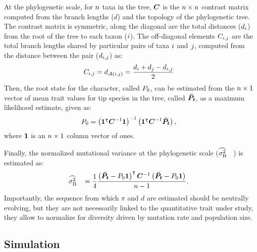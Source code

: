 \documentclass{article}
\begin{document}
At the phylogenetic scale, for $n$ taxa in the tree, $\bm{C}$ is the $n \times n$ contrast matrix computed from the branch lengths ($d$) and the topology of the phylogenetic tree.
The contrast matrix is symmetric, along the diagonal are the total distances ($d_{i}$) from the root of the tree to each taxon ($i$).
The off-diagonal elements $C_{i,j}$ are the total branch lengths shared by particular pairs of taxa $i$ and $j$, computed from the distance between the pair ($d_{i,j}$) as:
\begin{gather}
    C_{i,j} = d_{\mathcal{A}(i, j)} = \frac{d_{i} + d_{j} - d_{i,j}}{2}
\end{gather}
Then, the root state for the character, called $P_{0}$, can be estimated from the $n \times 1$ vector of mean trait values for tip species in the tree, called $\bm{\bar{P_{t}}}$, as a maximum likelihood estimate\cite{omeara_testing_2006}, given as:
\begin{gather}
    P_{0} = \left( \bm{1}^{\intercal} \bm{C}^{-1} \bm{1} \right)^{-1} \left( \bm{1}^{\intercal} \bm{C}^{-1} \bm{\bar{P_{t}}} \right), \label{eq:estimated-root-trait}
\end{gather}
where $\bm{1}$ is an $n \times 1$ column vector of ones.

Finally, the normalized mutational variance at the phylogenetic scale ($\EstRatePhy$) is estimated\cite{omeara_testing_2006} as:
\begin{gather}
    \EstRatePhy = \frac{1}{4}\frac{\left( \VecTrait -  \RootTrait \VecOne \right)\tr \Cr\inv \left( \VecTrait -  \RootTrait  \VecOne  \right)}{\NbrSpecies - 1}. \label{eq:estimated-rate-phy}
\end{gather}
Importantly, the sequence from which $\pi$ and $d$ are estimated should be neutrally evolving, but they are not necessarily linked to the quantitative trait under study, they allow to normalize for diversity driven by mutation rate and population size.

\subsection{Simulation}\label{subsec:simulations}
\end{document}

